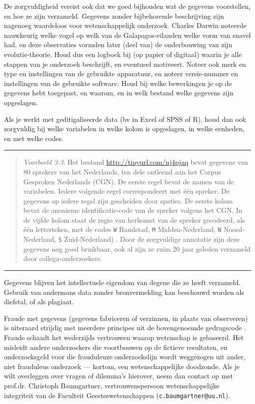 \documentclass[
]{book}
\begin{document}
De zorgvuldigheid vereist ook dat we goed bijhouden wat de gegevens
voorstellen, en hoe ze zijn verzameld. Gegevens zonder bijbehorende
beschrijving zijn nagenoeg waardeloos voor wetenschappelijk onderzoek.
Charles Darwin noteerde nauwkeurig welke vogel op welk van de
Galapagos-eilanden welke vorm van snavel had, en deze observaties
vormden later (deel van) de onderbouwing van zijn evolutie-theorie. Houd
dus een logboek bij (op papier of digitaal) waarin je alle stappen van
je onderzoek beschrijft, en eventueel motiveert. Noteer ook merk en type
en instellingen van de gebruikte apparatuur, en noteer versie-nummer en
instellingen van de gebruikte software. Houd bij welke bewerkingen je op
de gegevens hebt toegepast, en waarom, en in welk bestand welke gegevens
zijn opgeslagen.

Als je werkt met geditigaliseerde data (bv in Excel of SPSS of R), houd
dan ook zorgvuldig bij welke variabelen in welke kolom is opgeslagen, in
welke eenheden, en met welke codes.

\begin{center}\rule{0.5\linewidth}{0.5pt}\end{center}

\begin{quote}
\emph{Voorbeeld 3.3}: Het
bestand \url{http://tinyurl.com/nj4pjaq} bevat gegevens van 80 sprekers van
het Nederlands, ten dele ontleend aan het Corpus Gesproken Nederlands
(CGN). De eerste regel bevat de namen van de variabelen. Iedere volgende
regel correspondeert met één spreker. De gegevens op iedere regel zijn
gescheiden door spaties. De eerste kolom bevat de anonieme
identificatie-code van de spreker volgens het CGN. In de vijfde kolom
staat de regio van herkomst van de spreker gecodeerd, als één
letterteken, met de codes \texttt{W} Randstad, \texttt{M} Midden-Nederland, \texttt{N}
Noord-Nederland, \texttt{S} Zuid-Nederland) \citep{Quene08}. Door de zorgvuldige
annotatie zijn deze gegevens nog goed bruikbaar, ook al zijn ze ruim 20
jaar geleden verzameld door collega-onderzoekers.
\end{quote}

\begin{center}\rule{0.5\linewidth}{0.5pt}\end{center}

Gegevens blijven het intellectuele eigendom van degene die ze heeft
verzameld. Gebruik van andermans data zonder bronvermelding kan
beschouwd worden als diefstal, of als plagiaat.

Fraude met gegevens (gegevens fabriceren of verzinnen, in plaats van
observeren) is uiteraard strijdig met meerdere principes uit de
bovengenoemde gedragscode \citep{VSNU18}. Fraude schaadt het wederzijds
vertrouwen waarop wetenschap is gebaseerd. Het misleidt andere
onderzoekers die voortbouwen op de fictieve resultaten, en
onderzoeksgeld voor die frauduleuze onderzoekslijn wordt weggezogen uit
ander, niet frauduleus onderzoek --- kortom, een wetenschappelijke
doodzonde. Als je wilt overleggen over vragen of dilemma's hierover,
neem dan contact op met prof.dr. Christoph Baumgartner, vertrouwenspersoon
wetenschappelijke integriteit van de Faculteit Geesteswetenschappen
(\texttt{c.baumgartner@uu.nl}).
\end{document}
